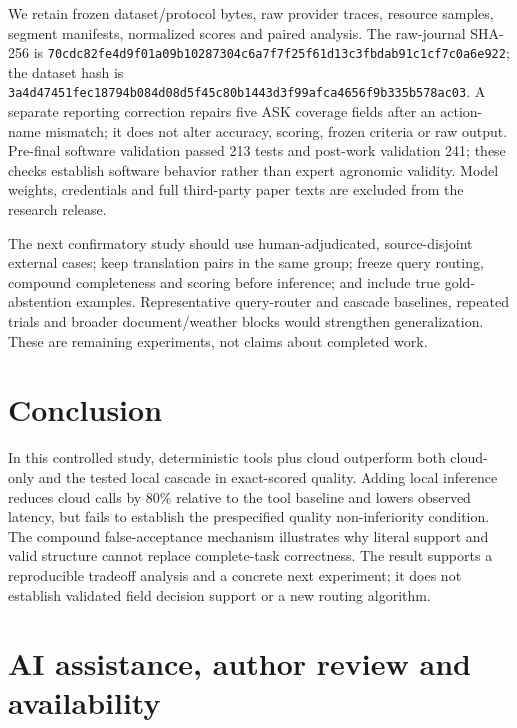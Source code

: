 \documentclass[10pt,a4paper,twocolumn]{article}
\begin{document}
We retain frozen dataset/protocol bytes, raw provider traces, resource samples, segment manifests, normalized scores and paired analysis. The raw-journal SHA-256 is {\small\texttt{70cdc82f\allowbreak{}e4d9f01a\allowbreak{}09b10287\allowbreak{}304c6a7f\allowbreak{}7f25f61d\allowbreak{}13c3fbda\allowbreak{}b91c1cf7\allowbreak{}c0a6e922}}; the dataset hash is {\small\texttt{3a4d4745\allowbreak{}1fec1879\allowbreak{}4b084d08\allowbreak{}d5f45c80\allowbreak{}b1443d3f\allowbreak{}99afca46\allowbreak{}56f9b335\allowbreak{}b578ac03}}. A separate reporting correction repairs five ASK coverage fields after an action-name mismatch; it does not alter accuracy, scoring, frozen criteria or raw output. Pre-final software validation passed 213 tests and post-work validation 241; these checks establish software behavior rather than expert agronomic validity. Model weights, credentials and full third-party paper texts are excluded from the research release.

The next confirmatory study should use human-adjudicated, source-disjoint external cases; keep translation pairs in the same group; freeze query routing, compound completeness and scoring before inference; and include true gold-abstention examples. Representative query-router and cascade baselines, repeated trials and broader document/weather blocks would strengthen generalization. These are remaining experiments, not claims about completed work.

\section{Conclusion}

In this controlled study, deterministic tools plus cloud outperform both cloud-only and the tested local cascade in exact-scored quality. Adding local inference reduces cloud calls by 80\% relative to the tool baseline and lowers observed latency, but fails to establish the prespecified quality non-inferiority condition. The compound false-acceptance mechanism illustrates why literal support and valid structure cannot replace complete-task correctness. The result supports a reproducible tradeoff analysis and a concrete next experiment; it does not establish validated field decision support or a new routing algorithm.

\section{AI assistance, author review and availability}
\end{document}
